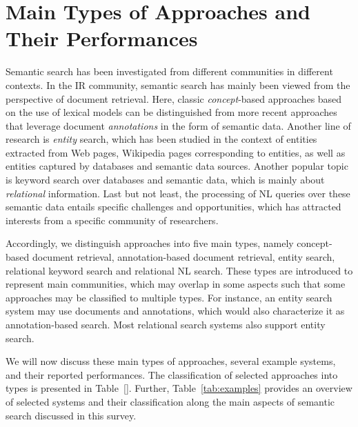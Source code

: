 \section{Main Types of Approaches and Their Performances}\label{sec:approaches}	
Semantic search has been investigated from different communities in different contexts. In the IR community, semantic search has mainly been viewed from the perspective of document retrieval. Here, classic \emph{concept}-based approaches based on the use of lexical models can be distinguished from more recent approaches that leverage document \emph{annotations} in the form of semantic data. Another line of research is \emph{entity} search, which has been studied in the context of entities extracted from Web pages, Wikipedia pages corresponding to entities, as well as entities captured by databases and semantic data sources. Another popular topic is keyword search over databases and semantic data, which is mainly about \emph{relational} information. Last but not least, the processing of NL queries over these semantic data entails specific challenges and opportunities, which has attracted interests from a specific community of researchers. 

Accordingly, we distinguish approaches into five main types, namely concept-based document retrieval, annotation-based document retrieval, entity search, relational keyword search and relational NL search. These types are introduced to represent main communities, which may overlap in some aspects such that some approaches may be classified to multiple types. For instance, an entity search system may use documents and annotations, which would also characterize it as annotation-based search. Most relational search systems also support entity search.  

We will now discuss these main types of approaches, several example systems, and their reported performances. The classification of selected approaches into types is presented in Table~\ref{}. Further, Table~\ref{tab:examples} provides an overview of selected systems and their classification along the main aspects of semantic search discussed in this survey. 



